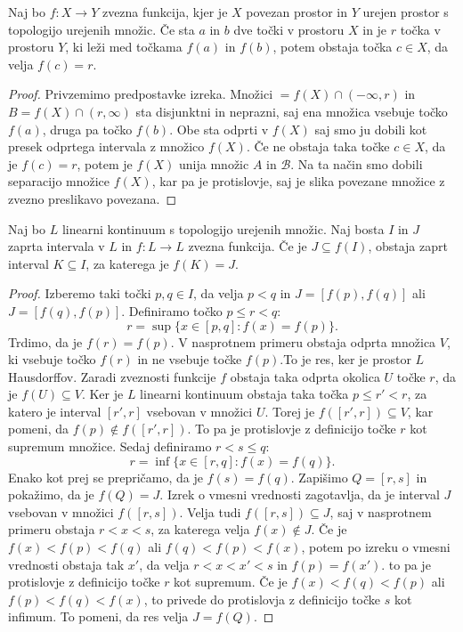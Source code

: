 \documentclass[../TG_magistrsko_delo_sections.tex]{subfiles}
\begin{document}
\begin{izrek}
Naj bo $f : X \to Y$ zvezna funkcija, kjer je $X$ povezan prostor in $Y$ urejen prostor s topologijo urejenih množic. Če sta $a$ in $b$ dve točki v prostoru $X$ in je $r$ točka v prostoru $Y$, ki leži med točkama $f(a)$ in $f(b)$, potem obstaja točka $c \in X$, da velja $f(c) = r$.
\end{izrek}
\begin{proof}
Privzemimo predpostavke izreka. Množici $=f(X) \cap (-\infty, r)$ in $B=f(X) \cap (r, \infty)$ sta disjunktni in neprazni, saj ena množica vsebuje točko $f(a)$, druga pa točko $f(b)$. Obe sta odprti v $f(X)$ saj smo ju dobili kot presek odprtega intervala z množico $f(X)$. Če ne obstaja taka točke $c \in X$, da je $f(c) = r$, potem je $f(X)$ unija množic $A$ in $\mathcal{B}$. Na ta način smo dobili separacijo množice $f(X)$, kar pa je protislovje, saj je slika povezane množice z zvezno preslikavo povezana.
\end{proof}

\begin{lema}\label{lem:K}
Naj bo $L$ linearni kontinuum s topologijo urejenih množic. Naj bosta $I$ in $J$ zaprta intervala v $L$ in $f:L \to L$ zvezna funkcija. Če je $J \subseteq f(I)$, obstaja zaprt interval $K \subseteq I$, za katerega je $f(K) = J$.
\end{lema}
\begin{proof}
Izberemo taki točki $p, q \in I$, da velja $p<q$ in $J=[f(p), f(q)]$ ali $J=[f(q), f(p)]$. Definiramo točko $p \leq r < q$:
$$r= \sup\{x \in [p, q] : f(x) = f(p)\}.$$
Trdimo, da je $f(r) = f(p)$. V nasprotnem primeru obstaja odprta množica $V$, ki vsebuje točko $f(r)$ in ne vsebuje točke $f(p)$.To je res, ker je prostor $L$ Hausdorffov. Zaradi zveznosti funkcije $f$ obstaja taka odprta okolica $U$ točke $r$, da je $f(U) \subseteq V$. Ker je $L$ linearni kontinuum obstaja taka točka $p \leq r' < r$, za katero je interval $[r', r]$ vsebovan v množici $U$. Torej je $f([r', r]) \subseteq V$, kar pomeni, da $f(p) \notin f([r', r])$. To pa je protislovje z definicijo točke $r$ kot supremum množice.
Sedaj definiramo $r<s \leq q$:
$$r= \inf\{x \in [r, q] : f(x) = f(q)\}.$$ 
Enako kot prej se prepričamo, da je $f(s) = f(q)$. Zapišimo $Q = [r, s]$ in pokažimo, da je $f(Q) = J$. Izrek o vmesni vrednosti zagotavlja, da je interval $J$ vsebovan v množici $f([r, s])$. Velja tudi $f([r, s]) \subseteq J$, saj v nasprotnem primeru obstaja $r<x<s$, za katerega velja $f(x) \notin J$. Če je $f(x) < f(p) < f(q)$ ali $f(q) < f(p) < f(x)$, potem po izreku o vmesni vrednosti obstaja tak $x'$, da velja $r<x<x'<s$ in $f(p) = f(x')$. to pa je protislovje z definicijo točke $r$ kot supremum. Če je $f(x) < f(q) < f(p)$ ali $f(p) < f(q) < f(x)$, to privede do protislovja z definicijo točke $s$ kot infimum. To pomeni, da res velja $J = f(Q)$.
\end{proof}
\end{document}
